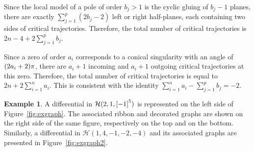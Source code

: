 \documentclass[11pt]{article}
\newcommand\calH{{\mathcal H}}
\theoremstyle{definition}
\newtheorem{ex}[thm]{Example}
\begin{document}
Since the local model of a pole of order $b_{j}>1$ is the cyclic gluing of $b_{j}-1$ planes, there are exactly $\sum_{j=1}^p (2b_{j}-2)$ left or right half-planes, each containing two sides of critical trajectories. Therefore, the total number of critical trajectories is $2n-4+ 2\sum_{j=1}^p b_{j}$.

Since a zero of order $a_{i}$ corresponds to a conical singularity with an angle of $(2a_{i}+\nobreak2)\pi$, there are $a_{i}+1$ incoming and $a_{i}+1$ outgoing critical trajectories at this zero. Therefore, the total number of critical trajectories is equal to $2n+2\sum_{i=1}^n a_{i}$. This is consistent with the identity $\sum_{i=1}^n a_{i} - \sum_{j=1}^p b_{j} = -2$.

\begin{ex}
A differential in $\calH(2,1,\rec[-1][5])$ is represented on the left side of Figure~\ref{fig:exgraph}. The associated ribbon and decorated graphs are shown on the right side of the same figure, respectively on the top and on the bottom. Similarly, a differential in $\mathcal{H}(1,4,-1,-2,-4)$ and its associated graphs are presented in Figure~\ref{fig:exgraph2}.
\begin{figure}[ht]
\centering
{}
\end{figure}
\end{ex}
\end{document}
